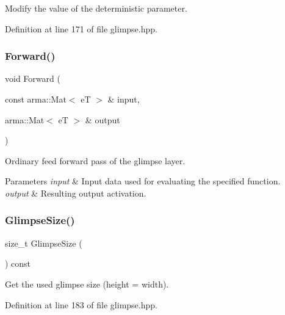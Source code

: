 Modify the value of the deterministic parameter. 



Definition at line 171 of file glimpse.\+hpp.

\mbox{\label{classmlpack_1_1ann_1_1Glimpse_a461f849bc638c15bec262dc9c3a58abe}} 
\subsubsection{Forward()}
{\footnotesize\ttfamily void Forward (\begin{DoxyParamCaption}\item[{const arma\+::\+Mat$<$ eT $>$ \&}]{input,  }\item[{arma\+::\+Mat$<$ eT $>$ \&}]{output }\end{DoxyParamCaption})}



Ordinary feed forward pass of the glimpse layer. 


\begin{DoxyParams}{Parameters}
{\em input} & Input data used for evaluating the specified function. \\
\hline
{\em output} & Resulting output activation. \\
\hline
\end{DoxyParams}
\mbox{\label{classmlpack_1_1ann_1_1Glimpse_a467c62da8a379d3066e836636a128036}} 
\subsubsection{Glimpse\+Size()}
{\footnotesize\ttfamily size\+\_\+t Glimpse\+Size (\begin{DoxyParamCaption}{ }\end{DoxyParamCaption}) const\hspace{0.3cm}{\ttfamily [inline]}}



Get the used glimpse size (height = width). 



Definition at line 183 of file glimpse.\+hpp.

\mbox{\label{classmlpack_1_1ann_1_1Glimpse_afb3fd4ed60dd057e7852221b89206f15}} 
